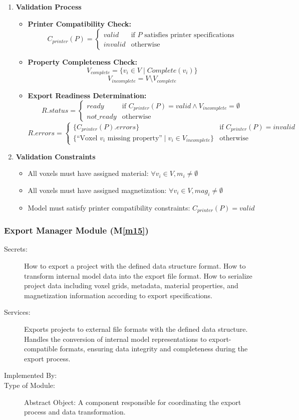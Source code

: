 \documentclass[12pt, titlepage]{article}
\newcommand{\mref}[1]{M\ref{#1}}
\begin{document}
\begin{enumerate}
\item \textbf{Validation Process}
\begin{itemize}
\item \textbf{Printer Compatibility Check:}
$$C_{printer}(P) = \begin{cases}
valid & \text{if } P \text{ satisfies printer specifications}\\
invalid & \text{otherwise}
\end{cases}$$
\item \textbf{Property Completeness Check:}
$$V_{complete} = \{v_i \in V \mid Complete(v_i)\}$$
$$V_{incomplete} = V \setminus V_{complete}$$
\item \textbf{Export Readiness Determination:}
$$R.status = \begin{cases}
ready & \text{if } C_{printer}(P) = valid \land V_{incomplete} = \emptyset\\
not\_ready & \text{otherwise}
\end{cases}$$
$$R.errors = \begin{cases}
\{C_{printer}(P).errors\} & \text{if } C_{printer}(P) = invalid\\
\{\text{``Voxel } v_i \text{ missing property''} \mid v_i \in V_{incomplete}\} & \text{otherwise}
\end{cases}$$
\end{itemize}
\item \textbf{Validation Constraints}
\begin{itemize}
\item All voxels must have assigned material: $\forall v_i \in V, m_i \neq \emptyset$
\item All voxels must have assigned magnetization: $\forall v_i \in V, mag_i \neq \emptyset$
\item Model must satisfy printer compatibility constraints: $C_{printer}(P) = valid$
\end{itemize}
\end{enumerate}
\fi

\subsubsection{Export Manager Module (\mref{m15})}

\begin{description}
\item[Secrets:] How to export a project with the defined data structure format. How to transform internal model data into the export file format. How to serialize project data including voxel grids, metadata, material properties, and magnetization information according to export specifications.
\item[Services:] Exports projects to external file formats with the defined data structure. Handles the conversion of internal model representations to export-compatible formats, ensuring data integrity and completeness during the export process.
\item[Implemented By:] \progname{}
\item[Type of Module:] Abstract Object: A component responsible for coordinating the export process and data transformation.
\end{description}
\end{document}
